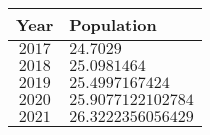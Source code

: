 \begin{tabular}{cl}           \toprule
Year   & Population         \\\midrule
$2017$ & $24.7029$          \\
$2018$ & $25.0981464$       \\
$2019$ & $25.4997167424$    \\
$2020$ & $25.9077122102784$ \\
$2021$ & $26.3222356056429$ \\\bottomrule
\end{tabular}
